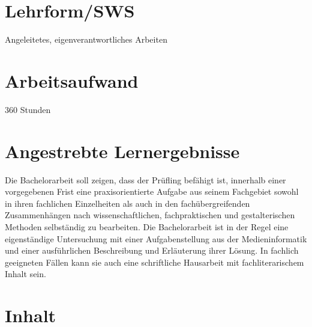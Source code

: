 \hypertarget{lehrformswspathlabelmi-2017modulbeschreibungen-bachelorba_bachelorarbeit}{%
\section*{Lehrform/SWS\label{/mi-2017/modulbeschreibungen-bachelor/BA_Bachelorarbeit}}\label{lehrformswspathlabelmi-2017modulbeschreibungen-bachelorba_bachelorarbeit}}

Angeleitetes, eigenverantwortliches Arbeiten

\hypertarget{arbeitsaufwandpathlabelmi-2017modulbeschreibungen-bachelorba_bachelorarbeit}{%
\section*{Arbeitsaufwand\label{/mi-2017/modulbeschreibungen-bachelor/BA_Bachelorarbeit}}\label{arbeitsaufwandpathlabelmi-2017modulbeschreibungen-bachelorba_bachelorarbeit}}

360 Stunden

\hypertarget{angestrebte-lernergebnissepathlabelmi-2017modulbeschreibungen-bachelorba_bachelorarbeit}{%
\section*{Angestrebte
Lernergebnisse\label{/mi-2017/modulbeschreibungen-bachelor/BA_Bachelorarbeit}}\label{angestrebte-lernergebnissepathlabelmi-2017modulbeschreibungen-bachelorba_bachelorarbeit}}

Die Bachelorarbeit soll zeigen, dass der Prüfling befähigt ist,
innerhalb einer vorgegebenen Frist eine praxisorientierte Aufgabe aus
seinem Fachgebiet sowohl in ihren fachlichen Einzelheiten als auch in
den fachübergreifenden Zusammenhängen nach wissenschaftlichen,
fachpraktischen und gestalterischen Methoden selbständig zu bearbeiten.
Die Bachelorarbeit ist in der Regel eine eigenständige Untersuchung mit
einer Aufgabenstellung aus der Medieninformatik und einer ausführlichen
Beschreibung und Erläuterung ihrer Lösung. In fachlich geeigneten Fällen
kann sie auch eine schriftliche Hausarbeit mit fachliterarischem Inhalt
sein.

\hypertarget{inhaltpathlabelmi-2017modulbeschreibungen-bachelorba_bachelorarbeit}{%
\section*{Inhalt\label{/mi-2017/modulbeschreibungen-bachelor/BA_Bachelorarbeit}}\label{inhaltpathlabelmi-2017modulbeschreibungen-bachelorba_bachelorarbeit}}

